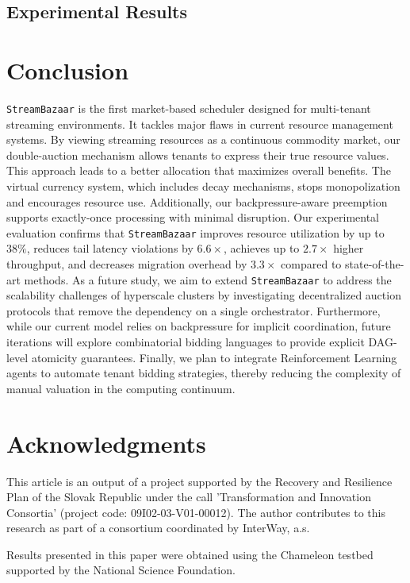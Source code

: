 \documentclass[lettersize,journal]{IEEEtran}
\begin{document}
\subsection{Experimental Results}



\section{Conclusion}\label{sec:conclusion}
\texttt{StreamBazaar} is the first market-based scheduler designed for multi-tenant streaming environments. It tackles major flaws in current resource management systems. By viewing streaming resources as a continuous commodity market, our double-auction mechanism allows tenants to express their true resource values. This approach leads to a better allocation that maximizes overall benefits. The virtual currency system, which includes decay mechanisms, stops monopolization and encourages resource use. Additionally, our backpressure-aware preemption supports exactly-once processing with minimal disruption.
Our experimental evaluation confirms that \texttt{StreamBazaar} improves resource utilization by up to $38\%$, reduces tail latency violations by $6.6\times$, achieves up to $2.7\times$ higher throughput, and decreases migration overhead by $3.3\times$ compared to state-of-the-art methods. 
As a future study, we aim to extend \texttt{StreamBazaar} to address the scalability challenges of hyperscale clusters by investigating decentralized auction protocols that remove the dependency on a single orchestrator. Furthermore, while our current model relies on backpressure for implicit coordination, future iterations will explore combinatorial bidding languages to provide explicit DAG-level atomicity guarantees. Finally, we plan to integrate Reinforcement Learning agents to automate tenant bidding strategies, thereby reducing the complexity of manual valuation in the computing continuum.

\section*{Acknowledgments}
This article is an output of a project supported by the Recovery and Resilience Plan of the Slovak Republic under the call 'Transformation and Innovation Consortia' (project code: 09I02-03-V01-00012). The author contributes to this research as part of a consortium coordinated by InterWay, a.s.

Results presented in this paper were obtained using the Chameleon testbed supported by the National Science Foundation. 
\end{document}
